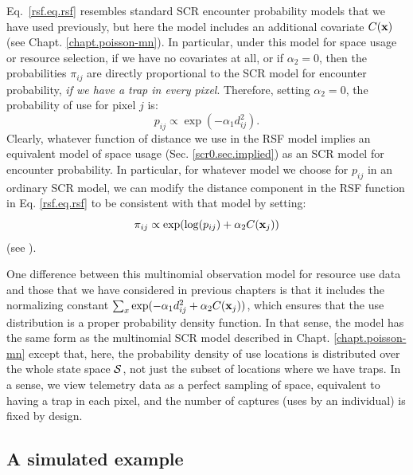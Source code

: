 Eq.~\ref{rsf.eq.rsf} resembles standard SCR encounter probability
models that we have used previously, but here the model includes an additional
covariate $C({\bf x})$ (see Chapt. \ref{chapt.poisson-mn}).  In
particular, under this model for space usage or resource selection, if
we have no covariates at all, or if $\alpha_{2} = 0$, then the
probabilities $\pi_{ij}$ are directly proportional to the SCR model
for encounter probability, {\it if we have a trap in every pixel}.  Therefore, setting $\alpha_{2} = 0$, 
the probability of use for pixel $j$ is:
\[
p_{ij} \propto  \exp( -\alpha_{1} d_{ij}^{2}).
\]
Clearly, whatever function of distance we use in the RSF model implies
an equivalent model of space usage (Sec. \ref{scr0.sec.implied}) as an
SCR model for encounter probability.  In particular, for whatever
model we choose for $p_{ij}$ in an ordinary SCR model, we can modify
the distance component in the RSF function in Eq. \ref{rsf.eq.rsf}
to be consistent with that model by setting: 
\[
\pi_{ij} \propto \exp( \log(p_{ij}) + \alpha_{2} C({\bf x}_{j}) )
\]
(see \citet{forester_etal:2009}).  

One difference between this multinomial observation model for resource
use data and those that we have considered in previous chapters is
that it includes the normalizing constant $\sum_{x} \exp(-\alpha_{1}
d_{ij}^{2} +\alpha_{2} C({\bf x}_{j}))$, which ensures that the use
distribution is a proper probability density function. In that sense,
the model has the same form as the multinomial SCR model described in
Chapt. \ref{chapt.poisson-mn} except that, here, the probability
density of use locations is distributed over the whole state space
${\cal S}$, not just the subset of locations where we have traps. In a
sense, we view telemetry data as a perfect sampling of space,
equivalent to having a trap in each pixel, and the number of captures
(uses by an individual) is fixed by design.

\subsection{A simulated example}

